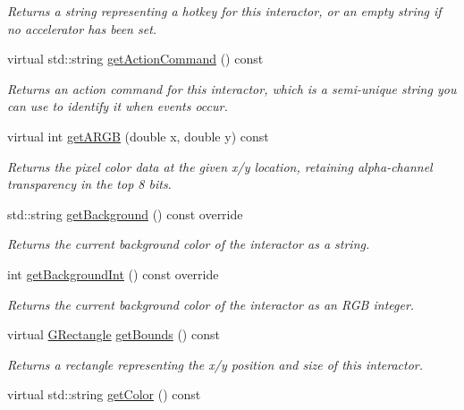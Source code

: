 \begin{DoxyCompactItemize}
\begin{DoxyCompactList}\small\item\em Returns a string representing a hotkey for this interactor, or an empty string if no accelerator has been set. \end{DoxyCompactList}\item 
virtual std\+::string \mbox{\hyperlink{classsgl_1_1GInteractor_a94eb4276000c4fdfb508ce9e6317a82a}{get\+Action\+Command}} () const
\begin{DoxyCompactList}\small\item\em Returns an action command for this interactor, which is a semi-\/unique string you can use to identify it when events occur. \end{DoxyCompactList}\item 
virtual int \mbox{\hyperlink{classsgl_1_1GDrawingSurface_ae394d39f20476570e083918d991c25bd}{get\+A\+R\+GB}} (double x, double y) const
\begin{DoxyCompactList}\small\item\em Returns the pixel color data at the given x/y location, retaining alpha-\/channel transparency in the top 8 bits. \end{DoxyCompactList}\item 
std\+::string \mbox{\hyperlink{classsgl_1_1GCanvas_a4a62c51b7244a7642b88065e3a07ae82}{get\+Background}} () const override
\begin{DoxyCompactList}\small\item\em Returns the current background color of the interactor as a string. \end{DoxyCompactList}\item 
int \mbox{\hyperlink{classsgl_1_1GCanvas_acd4f2b3b9619dacdfd71fc0004cac382}{get\+Background\+Int}} () const override
\begin{DoxyCompactList}\small\item\em Returns the current background color of the interactor as an R\+GB integer. \end{DoxyCompactList}\item 
virtual \mbox{\hyperlink{structsgl_1_1GRectangle}{G\+Rectangle}} \mbox{\hyperlink{classsgl_1_1GInteractor_a29e6ac35a0b48f491a4c88194cc5da3b}{get\+Bounds}} () const
\begin{DoxyCompactList}\small\item\em Returns a rectangle representing the x/y position and size of this interactor. \end{DoxyCompactList}\item 
virtual std\+::string \mbox{\hyperlink{classsgl_1_1GInteractor_aa061dfa488c31e18549d64363c1d0e34}{get\+Color}} () const

\end{DoxyCompactItemize}
